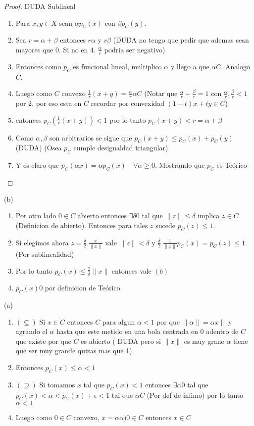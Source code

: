 \documentclass[10pt]{extarticle}
\theoremstyle{break}
\theoremstyle{definition}
\begin{document}
\begin{proof} DUDA
Sublineal
\begin{enumerate}
\item
Para $x,y\in X$ sean $\alpha p_{C}(x)$ con $\beta p_{C}(y)$.
\item
Sea $r=\alpha +\beta$ entonces $r\alpha$ y $r\beta$ (DUDA no tengo que pedir que ademas sean mayores que 0. Si no en 4. $\frac{\alpha }{r}$ podria ser negativo)
\item
Entonces como $p_{C}$ es funcional lineal, multiplico $\alpha$ y llego a que $\alpha C$. Analogo $C$.
\item
Luego como $C$ convexo $\frac{1}{r}(x+y)=\frac{\alpha }{r}\alpha C$
(Notar que $\frac{\alpha }{r}+ \frac{\beta}{r}=1$ con $\frac{\alpha }{r}, \frac{\beta}{r}<1$ por 2. por eso esta en $C$ recordar por convexidad $(1-t)x + ty \in C$)
\item
entonces $p_{C}\left( \frac{1}{r} (x+y)\right) < 1$ por lo tanto $p_{C}(x+y)<r=\alpha +\beta$
\item
Como $\alpha ,\beta$ son arbitrarios se sigue que $p_{C}(x+y)\leq p_{C}(x)+p_{C}(y)$ (DUDA) (Osea $p_{C}$ cumple desigualdad triangular)
\item
Y es claro que $p_{C}(\alpha x)=\alpha p_{C}(x)\quad\forall \alpha \geq 0$. Mostrando que $p_{C}$ es Teórico
\end{enumerate}
\end{proof}

(b)
\begin{enumerate}
\item
Por otro lado $0\in C$ abierto entonces $\exists \delta0$ tal que $\lVert z \rVert\leq \delta$ implica $z\in C$ (Definicion de abierto). Entonces para tales $z$ sucede $p_{C}(z)\leq 1$.
\item
Si elegimos ahora $z=\frac{\delta}{2}.\frac{x}{\lVert x \rVert}$ vale $\lVert z \rVert<\delta$ y $\frac{\delta}{2}.\frac{1}{\lVert x \rVert}p_{C}(x)=p_{C}(z)\leq 1$. (Por sublinealidad)
\item
Por lo tanto $p_{C}(x)\leq \frac{2}{\delta}\lVert x \rVert$ entonces vale $(b)$
\item
$p_{C}(x)0$ por definicion de Teórico
\end{enumerate}

(a)
\begin{enumerate}
\item $(\subseteq)$ Si $x\in C$ entonces $C$ para algun $\alpha<1$ por que $\lVert \alpha \rVert=\alpha x \rVert$ y agrando el $\alpha$ hasta que este metido en una bola centrada en $0$ adentro de $C$ que existe por que $C$ es abierto ( DUDA pero si $\lVert x \rVert$ es muy grane $\alpha$ tiene que ser muy grande quizas mas que 1)
\item Entonces $p_{C}(x)\leq \alpha <1$
\item
$(\supseteq)$ Si tomamos $x$ tal que $p_{C}(x)<1$ entonces $\exists \alpha0$ tal que $p_{C}(x)<\alpha <p_{C}(x)+\epsilon<1$ tal que $\alpha C$ (Por def de infimo) por lo tanto $\alpha <1$
\item
Luego como $0\in C$ convexo, $x=\alpha \alpha )0\in C$ entonces $x\in C$
\end{enumerate}
\end{document}
